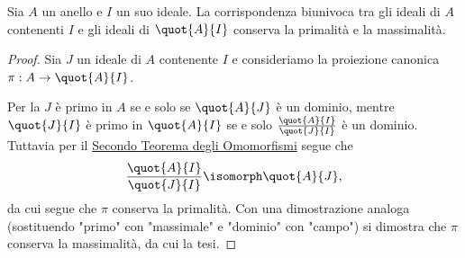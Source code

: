 \begin{corollary}{}{}
    Sia $A$ un anello e $I$ un suo ideale. La corrispondenza biunivoca tra gli ideali di $A$ contenenti $I$ e gli ideali di $\quot{A}{I}$ conserva la primalità e la massimalità.
\end{corollary}
\begin{proof}
    Sia $J$ un ideale di $A$ contenente $I$ e consideriamo la proiezione canonica $\pi : A \to \quot{A}{I}$.

    Per la  $J$ è primo in $A$ se e solo se $\quot{A}{J}$ è un dominio, mentre $\quot{J}{I}$ è primo in $\quot{A}{I}$ se e solo $\frac{\quot{A}{I}}{\quot{J}{I}}$ è un dominio. Tuttavia per il \hyperref[th:second_iso_rings]{Secondo Teorema degli Omomorfismi} segue che \[
        \dfrac{\quot{A}{I}}{\quot{J}{I}} \isomorph \quot{A}{J},
    \] da cui segue che $\pi$ conserva la primalità. Con una dimostrazione analoga (sostituendo "primo" con "massimale" e "dominio" con "campo") si dimostra che $\pi$ conserva la massimalità, da cui la tesi.
\end{proof}